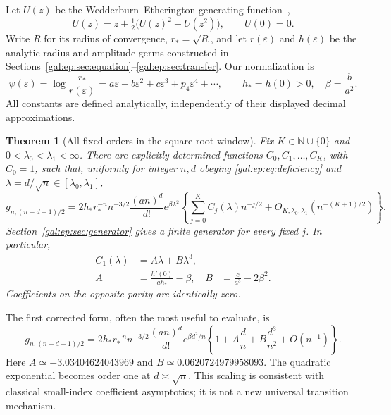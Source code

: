 \documentclass[11pt,letterpaper]{article}
\numberwithin{equation}{section}
\newtheorem{theorem}{Theorem}[section]
\theoremstyle{definition}\newtheorem{definition}[theorem]{Definition}
\theoremstyle{remark}\newtheorem{remark}[theorem]{Remark}
\newcommand{\eps}{\varepsilon}
\newcommand{\NN}{\mathbb N}
\newcommand{\Gnd}{g_{n,(n-d-1)/2}}
\begin{document}
Let $U(z)$ be the Wedderburn--Etherington generating function~\cite{oeisA001190},
\begin{equation}\label{gal:ep:eq:U}
U(z)=z+\tfrac12\bigl(U(z)^2+U(z^2)\bigr),\qquad U(0)=0.
\end{equation}
Write $R$ for its radius of convergence, $r_*=\sqrt R$, and let $r(\eps)$ and $h(\eps)$ be the analytic radius and amplitude germs constructed in Sections~\ref{gal:ep:sec:equation}--\ref{gal:ep:sec:transfer}. Our normalization is
\begin{equation}\label{gal:ep:eq:pressure}
\psi(\eps)=\log\frac{r_*}{r(\eps)}
 =a\eps+b\eps^2+c\eps^3+p_4\eps^4+\cdots,
\qquad h_*=h(0)>0,\quad \beta=\frac b{a^2}.
\end{equation}
All constants are defined analytically, independently of their displayed decimal approximations.

\begin{theorem}[All fixed orders in the square-root window]\label{gal:ep:thm:main}
Fix $K\in\NN\cup\{0\}$ and $0<\lambda_0<\lambda_1<\infty$. There are explicitly determined functions $C_0,C_1,\ldots,C_K$, with $C_0=1$, such that, uniformly for integer $n,d$ obeying \eqref{gal:ep:eq:deficiency} and $\lambda=d/\sqrt n\in[\lambda_0,\lambda_1]$,
\begin{equation}\label{gal:ep:eq:main}
\Gnd=
2h_*r_*^{-n}n^{-3/2}\frac{(an)^d}{d!}e^{\beta\lambda^2}
\left\{\sum_{j=0}^K C_j(\lambda)n^{-j/2}
+O_{K,\lambda_0,\lambda_1}\!\left(n^{-(K+1)/2}\right)\right\}.
\end{equation}
Section~\ref{gal:ep:sec:generator} gives a finite generator for every fixed $j$. In particular,
\begin{align}\label{gal:ep:eq:C1}
C_1(\lambda)&=A\lambda+B\lambda^3,\\
A&=\frac{h'(0)}{a h_*}-\beta,
& B&=\frac c{a^3}-2\beta^2.\nonumber
\end{align}
Coefficients on the opposite parity are identically zero.
\end{theorem}

The first corrected form, often the most useful to evaluate, is
\begin{equation}\label{gal:ep:eq:first}
\Gnd=
2h_*r_*^{-n}n^{-3/2}\frac{(an)^d}{d!}e^{\beta d^2/n}
\left\{1+A\frac dn+B\frac{d^3}{n^2}+O(n^{-1})\right\}.
\end{equation}
Here $A\simeq-3.03404624043969$ and $B\simeq0.0620724979958093$.
The quadratic exponential becomes order one at $d\asymp\sqrt n$. This scaling is consistent with classical small-index coefficient asymptotics; it is not a new universal transition mechanism.
\end{document}
